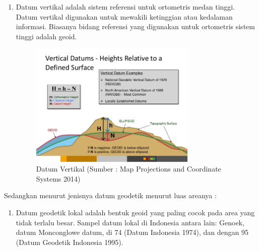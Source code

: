 \begin{enumerate}
\item Datum vertikal adalah sistem referensi untuk ortometris medan tinggi. Datum vertikal digunakan untuk mewakili ketinggian atau kedalaman informasi. Biasanya bidang referensi yang digunakan untuk ortometris sistem tinggi adalah geoid.
\begin{figure}[htbp]
		\centering
		\includegraphics[width=0.75\textwidth]{pictures/vertical_datum.jpg}
		\caption{Datum Vertikal (Sumber : Map Projections and Coordinate Systems 2014)}
		\label{Datum Vertikal}
		\end{figure}	
\end{enumerate}

Sedangkan menurut jenisnya datum geodetik menurut luas areanya :
\begin{enumerate}
\item Datum geodetik lokal adalah bentuk geoid yang paling cocok pada area yang tidak terlalu besar. Sampel datum lokal di Indonesia antara lain: Genoek, datum Monconglowe datum, di 74 (Datum Indonesia 1974), dan dengan 95 (Datum Geodetik Indonesia 1995).
\end{enumerate}